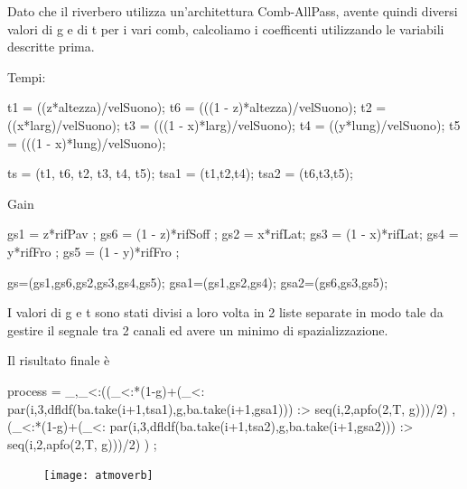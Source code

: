 Dato che il riverbero utilizza un'architettura Comb-AllPass, avente quindi diversi valori di g e di t
per i vari comb, calcoliamo i coefficenti utilizzando le variabili descritte prima.

\bigskip

Tempi:
\begin{code}
t1 = ((z*altezza)/velSuono);
t6 = (((1 - z)*altezza)/velSuono);
t2 = ((x*larg)/velSuono);
t3 = (((1 - x)*larg)/velSuono);
t4 = ((y*lung)/velSuono);
t5 = (((1 - x)*lung)/velSuono);

ts = (t1, t6, t2, t3, t4, t5);
tsa1 = (t1,t2,t4);
tsa2 = (t6,t3,t5);
\end{code}

Gain
\begin{code}
gs1 = z*rifPav ; 
gs6 = (1 - z)*rifSoff ;
gs2 = x*rifLat;
gs3 = (1 - x)*rifLat;
gs4 = y*rifFro ;
gs5 = (1 - y)*rifFro ;

gs=(gs1,gs6,gs2,gs3,gs4,gs5);
gsa1=(gs1,gs2,gs4);
gsa2=(gs6,gs3,gs5);
\end{code}

I valori di g e t sono stati divisi a loro volta in 2 liste separate in modo tale da gestire
il segnale tra 2 canali ed avere un minimo di spazializzazione.

Il risultato finale è

\begin{code}
process = _,_<:((_<:*(1-g)+(_<: par(i,3,dfldf(ba.take(i+1,tsa1),g,ba.take(i+1,gsa1))) :> 
seq(i,2,apfo(2,T, g)))/2) ,(_<:*(1-g)+(_<: par(i,3,dfldf(ba.take(i+1,tsa2),g,ba.take(i+1,gsa2))) :> 
seq(i,2,apfo(2,T, g)))/2) ) ;
\end{code}

\begin{figure}[htp]
\centering
\texttt{[image: atmoverb]}
\label{fig:atmoverb}
\end{figure}
